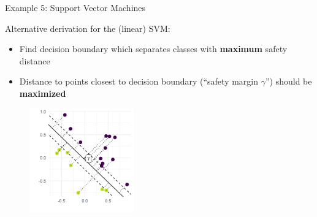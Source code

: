 \begin{vbframe}{Example 5: Support Vector Machines} 

Alternative derivation for the (linear) SVM: 

\begin{itemize}
	\item Find decision boundary which separates classes with \textbf{maximum} safety distance
	\item Distance to points closest to decision boundary (\enquote{safety margin $\gamma$}) should be \textbf{maximized}
\end{itemize}

\begin{figure}
	\begin{center}
		\includegraphics[width=0.4\textwidth]{figure_man/svm-example.pdf}
	\end{center}
\end{figure}

\end{vbframe}

